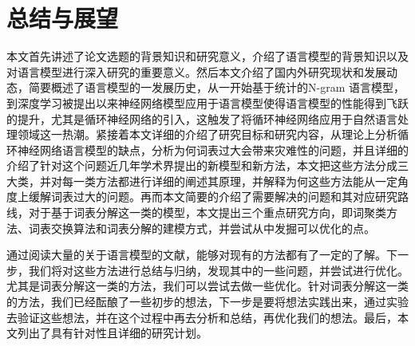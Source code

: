 \documentclass[12pt,a4paper]{article}
\begin{document}
\section{总结与展望}
本文首先讲述了论文选题的背景知识和研究意义，介绍了语言模型的背景知识以及对语言模型进行深入研究的重要意义。然后本文介绍了国内外研究现状和发展动态，简要概述了语言模型的一发展历史，从一开始基于统计的N-gram 语言模型，到深度学习被提出以来神经网络模型应用于语言模型使得语言模型的性能得到飞跃的提升，尤其是循环神经网络的引入，这触发了将循环神经网络应用于自然语言处理领域这一热潮。紧接着本文详细的介绍了研究目标和研究内容，从理论上分析循环神经网络语言模型的缺点，分析为何词表过大会带来灾难性的问题，并且详细的介绍了针对这个问题近几年学术界提出的新模型和新方法，本文把这些方法分成三大类，并对每一类方法都进行详细的阐述其原理，并解释为何这些方法能从一定角度上缓解词表过大的问题。再而本文简要的介绍了需要解决的问题和其对应研究路线，对于基于词表分解这一类的模型，本文提出三个重点研究方向，即词聚类方法、词表交换算法和词表分解的建模方式，并尝试从中发掘可以优化的点。

通过阅读大量的关于语言模型的文献，能够对现有的方法都有了一定的了解。下一步，我们将对这些方法进行总结与归纳，发现其中的一些问题，并尝试进行优化。尤其是词表分解这一类的方法，我们可以尝试去做一些优化。针对词表分解这一类的方法，我们已经酝酿了一些初步的想法，下一步是要将想法实践出来，通过实验去验证这些想法，并在这个过程中再去分析和总结，再优化我们的想法。最后，本文列出了具有针对性且详细的研究计划。
\newpage
{}

\end{document}

